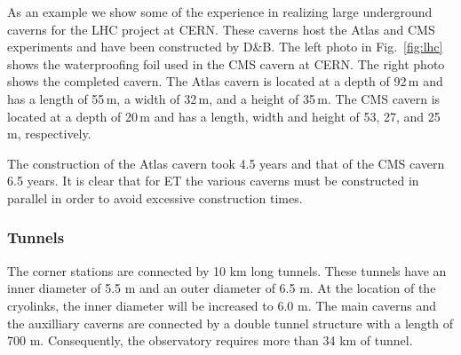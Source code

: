 As an example we show some of the experience in realizing large underground
caverns for the LHC project at CERN. These caverns host the Atlas and CMS experiments 
and have been constructed by D\&B. The left photo in Fig.~\ref{fig:lhc} shows the 
waterproofing foil used in the CMS
cavern at CERN. The right photo shows the completed cavern.
The Atlas cavern is located at a depth of 92\,m
and has a length of 55\,m, a width of 32\,m, and a height of 35\,m. The CMS
cavern is located at a depth of 20\,m and has a length, width and height of
53, 27, and 25\,m, respectively.

The construction of the Atlas cavern took 4.5 years and that of the CMS cavern 6.5 years. 
It is clear that for ET the various caverns must be constructed in parallel
in order to avoid excessive construction times.

\subsubsection{Tunnels}

The corner stations are connected by 10 km long tunnels. These tunnels
have an inner diameter of 5.5 m and an outer diameter of 6.5 m. At the location
of the cryolinks, the inner diameter will be increased to 6.0 m.
The main caverns and the auxilliary caverns are connected by a double
tunnel structure with a length of 700 m. 
Consequently, the observatory requires more than 34 km of tunnel.
  
